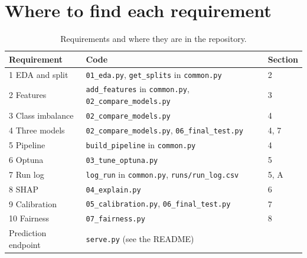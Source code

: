 \documentclass[11pt,a4paper]{article}
\begin{document}
\section{Where to find each requirement}
\begin{table}[H]
\centering\small
\begin{tabular}{lll}
\toprule
Requirement & Code & Section \\
\midrule
1 EDA and split & \texttt{01\_eda.py}, \texttt{get\_splits} in \texttt{common.py} & 2 \\
2 Features & \texttt{add\_features} in \texttt{common.py}, \texttt{02\_compare\_models.py} & 3 \\
3 Class imbalance & \texttt{02\_compare\_models.py} & 4 \\
4 Three models & \texttt{02\_compare\_models.py}, \texttt{06\_final\_test.py} & 4, 7 \\
5 Pipeline & \texttt{build\_pipeline} in \texttt{common.py} & 4 \\
6 Optuna & \texttt{03\_tune\_optuna.py} & 5 \\
7 Run log & \texttt{log\_run} in \texttt{common.py}, \texttt{runs/run\_log.csv} & 5, A \\
8 SHAP & \texttt{04\_explain.py} & 6 \\
9 Calibration & \texttt{05\_calibration.py}, \texttt{06\_final\_test.py} & 7 \\
10 Fairness & \texttt{07\_fairness.py} & 8 \\
Prediction endpoint & \texttt{serve.py} (see the README) & \\
\bottomrule
\end{tabular}
\caption{Requirements and where they are in the repository.}
\end{table}
\end{document}
